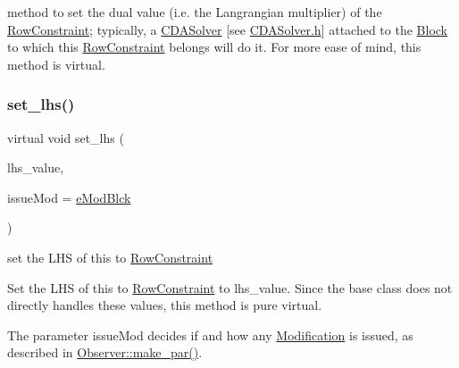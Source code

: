 method to set the dual value (i.\+e. the Langrangian multiplier) of the \mbox{\hyperlink{class_s_m_spp__di__unipi__it_1_1_row_constraint}{Row\+Constraint}}; typically, a \mbox{\hyperlink{class_s_m_spp__di__unipi__it_1_1_c_d_a_solver}{C\+D\+A\+Solver}} \mbox{[}see \mbox{\hyperlink{_c_d_a_solver_8h}{C\+D\+A\+Solver.\+h}}\mbox{]} attached to the \mbox{\hyperlink{class_s_m_spp__di__unipi__it_1_1_block}{Block}} to which this \mbox{\hyperlink{class_s_m_spp__di__unipi__it_1_1_row_constraint}{Row\+Constraint}} belongs will do it. For more ease of mind, this method is virtual. \mbox{\label{class_s_m_spp__di__unipi__it_1_1_row_constraint_a1e707449bc5e308a84fbb17197e184a6}} 
\subsubsection{\texorpdfstring{set\+\_\+lhs()}{set\_lhs()}}
{\footnotesize\ttfamily virtual void set\+\_\+lhs (\begin{DoxyParamCaption}\item[{\mbox{\hyperlink{class_s_m_spp__di__unipi__it_1_1_row_constraint_a34abd4b01d3a2024be5f6d13dd88779f}{c\+\_\+\+R\+H\+S\+Value}}}]{lhs\+\_\+value,  }\item[{\mbox{\hyperlink{group___modification___t_y_p_e_s_ga544246d8c462e9a2d817c2c30797968f}{c\+\_\+\+Mod\+Param}}}]{issue\+Mod = {\ttfamily \mbox{\hyperlink{group___modification___t_y_p_e_s_gga48fddcdd03a03f49b7e389ca1ed938d4a21b14b26b1c0093a0905f6fc010bad29}{e\+Mod\+Blck}}} }\end{DoxyParamCaption})\hspace{0.3cm}{\ttfamily [pure virtual]}}



set the L\+HS of this to \mbox{\hyperlink{class_s_m_spp__di__unipi__it_1_1_row_constraint}{Row\+Constraint}} 

Set the L\+HS of this to \mbox{\hyperlink{class_s_m_spp__di__unipi__it_1_1_row_constraint}{Row\+Constraint}} to lhs\+\_\+value. Since the base class does not directly handles these values, this method is pure virtual.

The parameter issue\+Mod decides if and how any \mbox{\hyperlink{class_s_m_spp__di__unipi__it_1_1_modification}{Modification}} is issued, as described in \mbox{\hyperlink{class_s_m_spp__di__unipi__it_1_1_observer_a2d499ae38e5e95cf66cd71da32b0694a}{Observer\+::make\+\_\+par()}}. 

